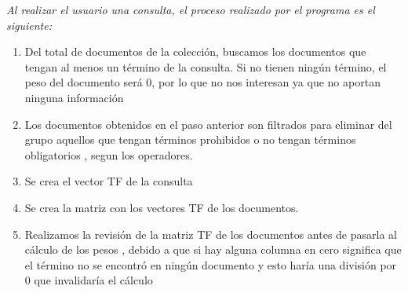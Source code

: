 \documentclass{article}%
\begin{document}
\begin{Large}
    \hspace*{10cm}

{\textit{Al realizar el usuario una consulta, el proceso realizado por el programa es el siguiente:}}

\end{Large}
    \begin{enumerate}
        \item Del total de documentos de la colección, buscamos los documentos que tengan al menos un término de la consulta. Si no tienen ningún término, el peso del documento será 0, por lo que no nos interesan ya que no aportan ninguna información
    \item Los documentos obtenidos en el paso anterior son filtrados para eliminar del grupo aquellos que tengan términos prohibidos o no tengan términos obligatorios , segun los operadores.
    \item Se crea el vector TF de la consulta
    \item Se crea la matriz con los vectores TF de los documentos.
    \item Realizamos la revisión de la matriz TF de los documentos antes de pasarla al cálculo de los pesos , debido a que si hay alguna columna en cero significa que el término no se encontró en ningún documento y esto haría una división por 0 que invalidaría el cálculo
    

\end{enumerate}
\end{document}
